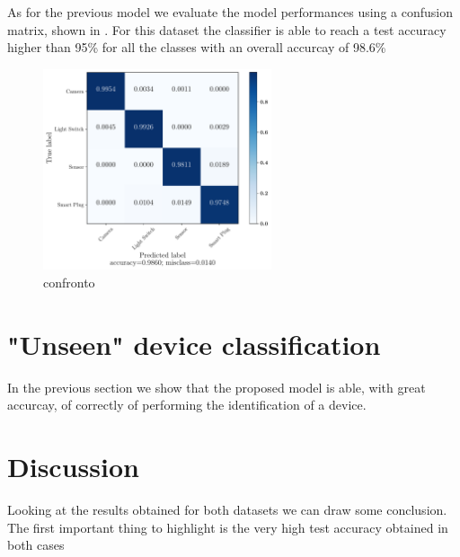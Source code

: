 As for the previous model we evaluate the model performances using a confusion matrix, shown in . For this dataset the classifier is able to reach a test accuracy higher than 95\% for all the classes with an overall accurcay of 98.6\%

\begin{figure}[h]
    \centering
        \includegraphics[width=0.6\textwidth]{images/results/IoT_clasf_20210613-175027__type_1branch_no_pool__st_scale_sub__lb_30__act_elu__nf_16__ks_10__nn_50__l2_1e-05__bs_200__ep_300___cm.pdf}
    \caption{confronto}
    \label{fig:iot_results_cm}
\end{figure}



\section{"Unseen" device classification}\label{res_unseen}

In the previous section we show that the proposed model is able, with great accurcay, of correctly of performing the identification of a device.



\section{Discussion}

Looking at the results obtained for both datasets we can draw some conclusion. The first important thing to highlight is the very high test accuracy obtained in both cases 
